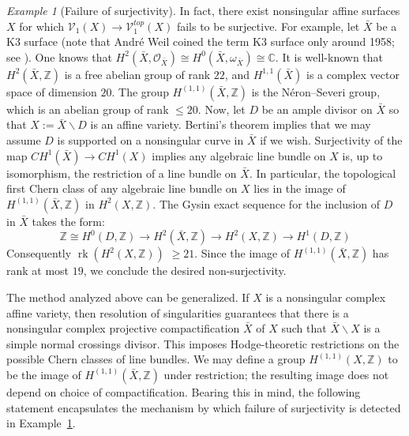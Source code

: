 \documentclass[11pt,leqno]{article}
\newcommand{\cplx}{{\mathbb C}}
\newcommand{\Z}{{\mathbb Z}}
\renewcommand{\1}{{\rm 1\hspace*{-0.4ex}%
\rule{0.1ex}{1.52ex}\hspace*{0.2ex}}}
\newcommand{\<}[1]{{\langle}#1 {\rangle}}
\renewcommand{\setminus}{\smallsetminus}
\theoremstyle{plain}
\theoremstyle{definition}
\theoremstyle{remark}
\newtheorem{rem}[theorem]{Remark}
\newtheorem{ex}[theorem]{Example}
\numberwithin{equation}{subsection}
\begin{document}
\begin{ex}[Failure of surjectivity]
	\label{ex:surjectivityfails}
	In fact, there exist nonsingular affine surfaces $X$ for which $\mathscr{V}_1(X) \to \mathscr{V}_1^{top}(X)$ fails to be surjective.  For example, let $\bar{X}$ be a K3 surface (note that Andr\'e Weil coined the term K3 surface only around 1958; see \cite[p. 390]{WeilII}).  One knows that $H^2(\bar{X},\mathscr{O}_{\bar{X}}) \cong H^0(\bar{X},\omega_{\bar{X}}) \cong \cplx$.  It is well-known that $H^2(\bar{X},\Z)$ is a free abelian group of rank $22$, and  $H^{1,1}(\bar{X})$ is a complex vector space of dimension $20$.  The group $H^{(1,1)}(\bar{X},\Z)$ is the N\'eron--Severi group, which is an abelian group of rank $\leq 20$.  Now, let $D$ be an ample divisor on $\bar{X}$ so that $X := \bar{X} \setminus D$ is an affine variety.  Bertini's theorem implies that we may assume $D$ is supported on a nonsingular curve in $\bar{X}$ if we wish.  Surjectivity of the map $CH^1(\bar{X}) \to CH^1(X)$ implies any algebraic line bundle on $X$ is, up to isomorphism, the restriction of a line bundle on $\bar{X}$.  In particular, the topological first Chern class of any algebraic line bundle on $X$ lies in the image of $H^{(1,1)}(\bar{X},\Z)$ in $H^2(X,\Z)$. The Gysin exact sequence for the inclusion of $D$ in $\bar{X}$ takes the form:
	\[
	\Z \cong H^0(D,\Z) \longrightarrow H^2(\bar{X},\Z) \longrightarrow H^2(X,\Z) \longrightarrow H^1(D,\Z) 
	\]
	Consequently $\operatorname{rk}(H^2(X,\Z))$ $\geq 21$.  Since the image of $H^{(1,1)}(\bar{X},\Z)$ has rank at most $19$, we conclude the desired non-surjectivity.
\end{ex}


The method analyzed above can be generalized.  If $X$ is a nonsingular complex affine variety, then resolution of singularities guarantees that there is a nonsingular complex projective compactification $\bar{X}$ of $X$ such that $\bar{X} \setminus X$ is a simple normal crossings divisor.  This imposes Hodge-theoretic restrictions on the possible Chern classes of line bundles.  We may define a group $H^{(1,1)}(X,\Z)$ to be the image of $H^{(1,1)}(\bar{X},\Z)$ under restriction; the resulting image does not depend on choice of compactification.  Bearing this in mind, the following statement encapsulates the mechanism by which failure of surjectivity is detected in Example~\ref{ex:surjectivityfails}.
\end{document}
